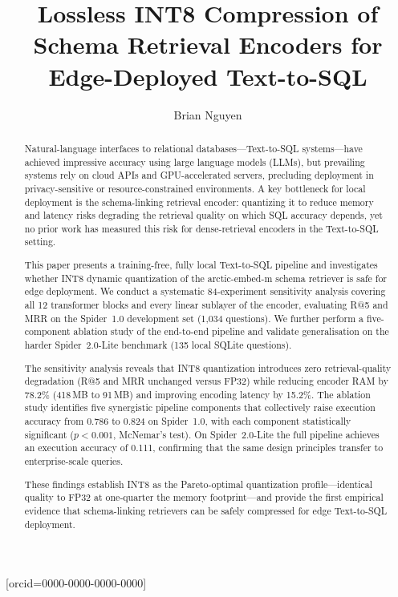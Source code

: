 \documentclass[a4paper,fleqn]{cas-dc}
\begin{document}
\let\WriteBookmarks\relax


\title[mode=title]{Lossless INT8 Compression of Schema Retrieval Encoders
  for Edge-Deployed Text-to-SQL}

\author[1]{Brian Nguyen}[orcid=0000-0000-0000-0000]

\begin{abstract}
Natural-language interfaces to relational databases---Text-to-SQL
systems---have achieved impressive accuracy using large language models (LLMs),
but prevailing systems rely on cloud APIs and GPU-accelerated servers,
precluding deployment in privacy-sensitive or resource-constrained environments.
A key bottleneck for local deployment is the schema-linking retrieval encoder:
quantizing it to reduce memory and latency risks degrading the retrieval
quality on which SQL accuracy depends, yet no prior work has measured this
risk for dense-retrieval encoders in the Text-to-SQL setting.

This paper presents a training-free, fully local Text-to-SQL pipeline and
investigates whether INT8 dynamic quantization of the arctic-embed-m
schema retriever is safe for edge deployment.
We conduct a systematic 84-experiment sensitivity analysis covering all
12 transformer blocks and every linear sublayer of the encoder, evaluating
R@5 and MRR on the Spider~1.0 development set (1{,}034 questions).
We further perform a five-component ablation study of the end-to-end
pipeline and validate generalisation on the harder Spider~2.0-Lite
benchmark (135 local SQLite questions).

The sensitivity analysis reveals that INT8 quantization introduces zero
retrieval-quality degradation (R@5 and MRR unchanged versus FP32) while
reducing encoder RAM by 78.2\% (418\,MB to 91\,MB) and improving encoding
latency by 15.2\%.
The ablation study identifies five synergistic pipeline components that
collectively raise execution accuracy from 0.786 to 0.824 on Spider~1.0,
with each component statistically significant ($p < 0.001$, McNemar's test).
On Spider~2.0-Lite the full pipeline achieves an execution accuracy of 0.111,
confirming that the same design principles transfer to enterprise-scale queries.

These findings establish INT8 as the Pareto-optimal quantization
profile---identical quality to FP32 at one-quarter the memory
footprint---and provide the first empirical evidence that schema-linking
retrievers can be safely compressed for edge Text-to-SQL deployment.
\end{abstract}
\end{document}
